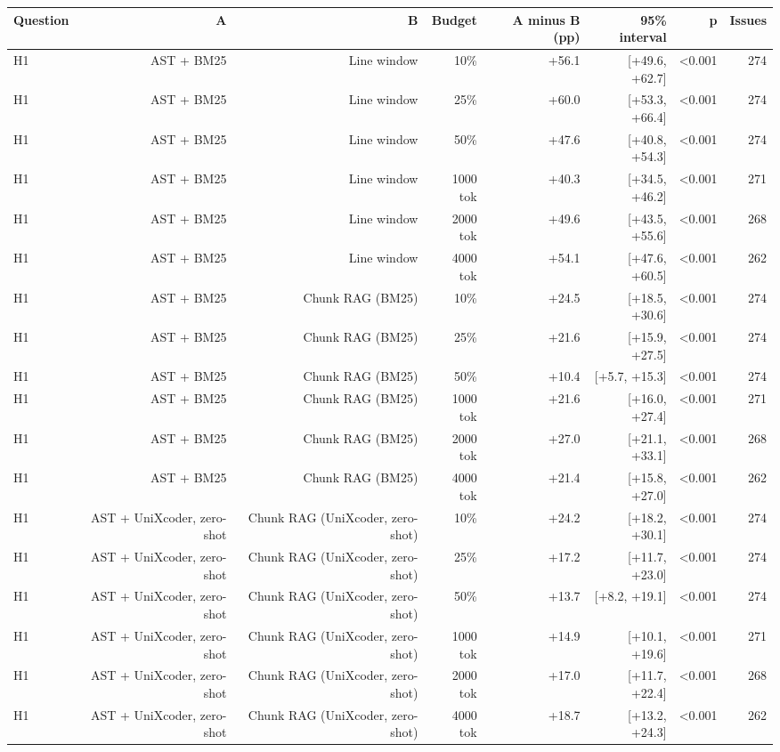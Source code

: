 \begin{tabular}{lrrrrrrr}
\toprule
Question & A & B & Budget & A minus B (pp) & 95\% interval & p & Issues \\
\midrule
H1 & AST + BM25 & Line window & 10\% & +56.1 & [+49.6, +62.7] & <0.001 & 274 \\
H1 & AST + BM25 & Line window & 25\% & +60.0 & [+53.3, +66.4] & <0.001 & 274 \\
H1 & AST + BM25 & Line window & 50\% & +47.6 & [+40.8, +54.3] & <0.001 & 274 \\
H1 & AST + BM25 & Line window & 1000 tok & +40.3 & [+34.5, +46.2] & <0.001 & 271 \\
H1 & AST + BM25 & Line window & 2000 tok & +49.6 & [+43.5, +55.6] & <0.001 & 268 \\
H1 & AST + BM25 & Line window & 4000 tok & +54.1 & [+47.6, +60.5] & <0.001 & 262 \\
H1 & AST + BM25 & Chunk RAG (BM25) & 10\% & +24.5 & [+18.5, +30.6] & <0.001 & 274 \\
H1 & AST + BM25 & Chunk RAG (BM25) & 25\% & +21.6 & [+15.9, +27.5] & <0.001 & 274 \\
H1 & AST + BM25 & Chunk RAG (BM25) & 50\% & +10.4 & [+5.7, +15.3] & <0.001 & 274 \\
H1 & AST + BM25 & Chunk RAG (BM25) & 1000 tok & +21.6 & [+16.0, +27.4] & <0.001 & 271 \\
H1 & AST + BM25 & Chunk RAG (BM25) & 2000 tok & +27.0 & [+21.1, +33.1] & <0.001 & 268 \\
H1 & AST + BM25 & Chunk RAG (BM25) & 4000 tok & +21.4 & [+15.8, +27.0] & <0.001 & 262 \\
H1 & AST + UniXcoder, zero-shot & Chunk RAG (UniXcoder, zero-shot) & 10\% & +24.2 & [+18.2, +30.1] & <0.001 & 274 \\
H1 & AST + UniXcoder, zero-shot & Chunk RAG (UniXcoder, zero-shot) & 25\% & +17.2 & [+11.7, +23.0] & <0.001 & 274 \\
H1 & AST + UniXcoder, zero-shot & Chunk RAG (UniXcoder, zero-shot) & 50\% & +13.7 & [+8.2, +19.1] & <0.001 & 274 \\
H1 & AST + UniXcoder, zero-shot & Chunk RAG (UniXcoder, zero-shot) & 1000 tok & +14.9 & [+10.1, +19.6] & <0.001 & 271 \\
H1 & AST + UniXcoder, zero-shot & Chunk RAG (UniXcoder, zero-shot) & 2000 tok & +17.0 & [+11.7, +22.4] & <0.001 & 268 \\
H1 & AST + UniXcoder, zero-shot & Chunk RAG (UniXcoder, zero-shot) & 4000 tok & +18.7 & [+13.2, +24.3] & <0.001 & 262 \\

\end{tabular}
